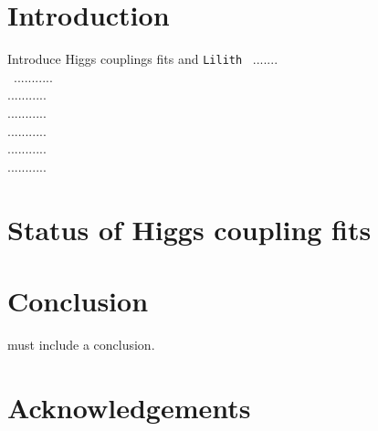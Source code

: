 \documentclass[submission, Phys]{SciPost}
\begin{document}


\section{Introduction} \label{sec:intro}

Introduce Higgs couplings fits and  {\tt Lilith}~\cite{Bernon:2015hsa} .......  \\\
...........\\
...........\\
...........\\
...........\\
...........\\
...........\\









\section{Status of Higgs coupling fits}


\section{Conclusion}
 must include a conclusion.

\section*{Acknowledgements}
\end{document}
